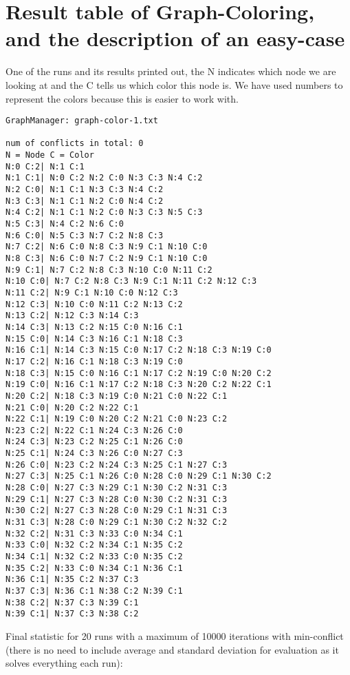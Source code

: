 \documentclass[12pt, a4paper]{article}
\begin{document}
\section{Result table of Graph-Coloring, and the description of an easy-case}
One of the runs and its results printed out, the N indicates which node we are looking at and the C tells us which color this node is. We have used numbers to represent the colors because this is easier to work with.\\
\begin{verbatim}
GraphManager: graph-color-1.txt

num of conflicts in total: 0
N = Node C = Color
N:0 C:2| N:1 C:1 
N:1 C:1| N:0 C:2 N:2 C:0 N:3 C:3 N:4 C:2 
N:2 C:0| N:1 C:1 N:3 C:3 N:4 C:2 
N:3 C:3| N:1 C:1 N:2 C:0 N:4 C:2 
N:4 C:2| N:1 C:1 N:2 C:0 N:3 C:3 N:5 C:3 
N:5 C:3| N:4 C:2 N:6 C:0 
N:6 C:0| N:5 C:3 N:7 C:2 N:8 C:3 
N:7 C:2| N:6 C:0 N:8 C:3 N:9 C:1 N:10 C:0 
N:8 C:3| N:6 C:0 N:7 C:2 N:9 C:1 N:10 C:0 
N:9 C:1| N:7 C:2 N:8 C:3 N:10 C:0 N:11 C:2 
N:10 C:0| N:7 C:2 N:8 C:3 N:9 C:1 N:11 C:2 N:12 C:3 
N:11 C:2| N:9 C:1 N:10 C:0 N:12 C:3 
N:12 C:3| N:10 C:0 N:11 C:2 N:13 C:2 
N:13 C:2| N:12 C:3 N:14 C:3 
N:14 C:3| N:13 C:2 N:15 C:0 N:16 C:1 
N:15 C:0| N:14 C:3 N:16 C:1 N:18 C:3 
N:16 C:1| N:14 C:3 N:15 C:0 N:17 C:2 N:18 C:3 N:19 C:0 
N:17 C:2| N:16 C:1 N:18 C:3 N:19 C:0 
N:18 C:3| N:15 C:0 N:16 C:1 N:17 C:2 N:19 C:0 N:20 C:2 
N:19 C:0| N:16 C:1 N:17 C:2 N:18 C:3 N:20 C:2 N:22 C:1 
N:20 C:2| N:18 C:3 N:19 C:0 N:21 C:0 N:22 C:1 
N:21 C:0| N:20 C:2 N:22 C:1 
N:22 C:1| N:19 C:0 N:20 C:2 N:21 C:0 N:23 C:2 
N:23 C:2| N:22 C:1 N:24 C:3 N:26 C:0 
N:24 C:3| N:23 C:2 N:25 C:1 N:26 C:0 
N:25 C:1| N:24 C:3 N:26 C:0 N:27 C:3 
N:26 C:0| N:23 C:2 N:24 C:3 N:25 C:1 N:27 C:3 
N:27 C:3| N:25 C:1 N:26 C:0 N:28 C:0 N:29 C:1 N:30 C:2 
N:28 C:0| N:27 C:3 N:29 C:1 N:30 C:2 N:31 C:3 
N:29 C:1| N:27 C:3 N:28 C:0 N:30 C:2 N:31 C:3 
N:30 C:2| N:27 C:3 N:28 C:0 N:29 C:1 N:31 C:3 
N:31 C:3| N:28 C:0 N:29 C:1 N:30 C:2 N:32 C:2 
N:32 C:2| N:31 C:3 N:33 C:0 N:34 C:1 
N:33 C:0| N:32 C:2 N:34 C:1 N:35 C:2 
N:34 C:1| N:32 C:2 N:33 C:0 N:35 C:2 
N:35 C:2| N:33 C:0 N:34 C:1 N:36 C:1 
N:36 C:1| N:35 C:2 N:37 C:3 
N:37 C:3| N:36 C:1 N:38 C:2 N:39 C:1 
N:38 C:2| N:37 C:3 N:39 C:1 
N:39 C:1| N:37 C:3 N:38 C:2 

\end{verbatim}
\noindent
Final statistic for 20 runs with a maximum of 10000 iterations with min-conflict (there is no need to include average and standard deviation for evaluation as it solves everything each run):\\
\end{document}
